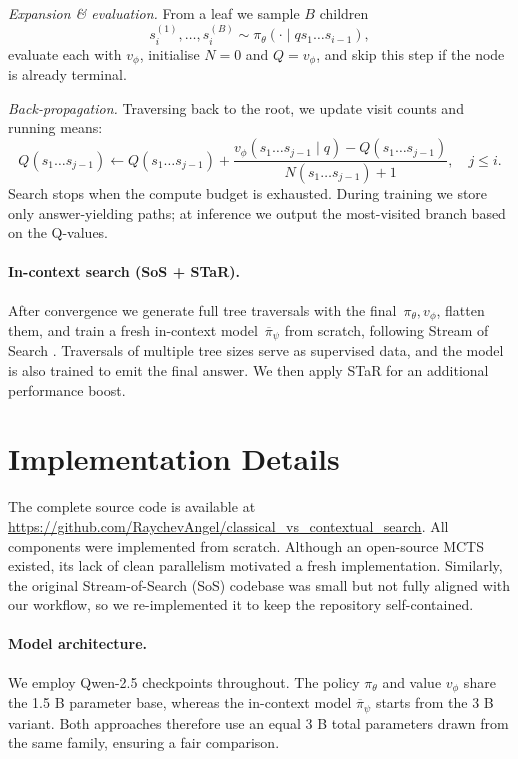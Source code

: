 \documentclass{article}
\begin{document}
\textit{Expansion \& evaluation.}  
From a leaf we sample $B$ children
\[
  s_i^{(1)},\dots,s_i^{(B)}
  \sim \pi_\theta(\cdot\mid q s_1\!\ldots s_{i-1}),
\]
evaluate each with $v_\phi$, initialise
$N\!=\!0$ and $Q\!=\!v_\phi$, and skip this step if the node is already
terminal.

\textit{Back-propagation.}  
Traversing back to the root, we update visit counts and
running means:
\[
  Q(s_1\!\ldots s_{j-1}) \gets
  Q(s_1\!\ldots s_{j-1}) +
  \frac{v_\phi(s_1\!\ldots s_{j-1}\mid q) - Q(s_1\!\ldots s_{j-1})}
       {N(s_1\!\ldots s_{j-1}) + 1},
  \quad j\le i.
\]
Search stops when the compute budget is exhausted.
During training we store only answer-yielding paths; at inference we output the most-visited branch based on the Q-values.

\paragraph{In-context search (SoS + STaR).}
After convergence we generate full tree traversals with the
final~$\pi_\theta,v_\phi$, flatten them, and train a fresh
in-context model~$\overline{\pi}_\psi$ from scratch, following
Stream of Search \cite{gandhi2024stream}.
Traversals of multiple tree sizes serve as supervised data,
and the model is also trained to emit the final answer.
We then apply STaR for an additional performance boost.

\section{Implementation Details}

The complete source code is available at
\url{https://github.com/RaychevAngel/classical_vs_contextual_search}.
All components were implemented from scratch.  
Although an open-source MCTS existed, its lack of clean parallelism
motivated a fresh implementation.
Similarly, the original Stream-of-Search (SoS) codebase was small but
not fully aligned with our workflow, so we re-implemented it to keep the
repository self-contained.

\paragraph{Model architecture.}
We employ Qwen-2.5 checkpoints throughout.
The policy $\pi_\theta$ and value $v_\phi$ share the 1.5 B
parameter base, whereas the in-context model
$\overline{\pi}_\psi$ starts from the 3 B variant.
Both approaches therefore use an equal 3 B total parameters drawn from
the same family, ensuring a fair comparison.
\end{document}
